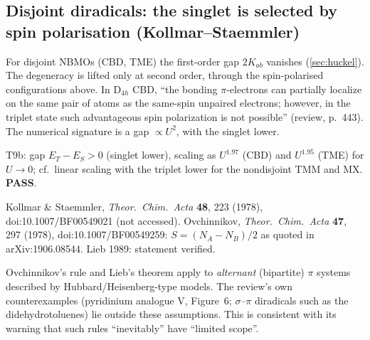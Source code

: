 \subsection{Disjoint diradicals: the singlet is selected by spin polarisation (Kollmar--Staemmler)}
For disjoint NBMOs (CBD, TME) the first-order gap $2K_{ab}$ vanishes (\cref{sec:huckel}). The degeneracy is
lifted only at second order, through the spin-polarised configurations above. In D$_{4h}$ CBD, ``the
bonding $\pi$-electrons can partially localize on the same pair of atoms as the same-spin unpaired
electrons; however, in the triplet state such advantageous spin polarization is not possible'' (review,
p.~443). The numerical signature is a gap $\propto U^2$, with the singlet lower.
\begin{verifybox}
T9b: gap $E_T-E_S>0$ (singlet lower), scaling as $U^{1.97}$ (CBD) and $U^{1.95}$ (TME) for $U\to0$;
cf.\ linear scaling with the triplet lower for the nondisjoint TMM and MX. \textbf{PASS}.
\end{verifybox}
\begin{sourcebox}
Kollmar \& Staemmler, \emph{Theor.\ Chim.\ Acta} \textbf{48}, 223 (1978), doi:10.1007/BF00549021 (not accessed).
Ovchinnikov, \emph{Theor.\ Chim.\ Acta} \textbf{47}, 297 (1978), doi:10.1007/BF00549259: $S=(N_A-N_B)/2$ as quoted in
arXiv:1906.08544. Lieb 1989: statement verified.
\end{sourcebox}
\begin{caveatbox}
Ovchinnikov's rule and Lieb's theorem apply to \emph{alternant} (bipartite) $\pi$ systems described by
Hubbard/Heisenberg-type models. The review's own counterexamples (pyridinium analogue V, Figure~6;
$\sigma$--$\pi$ diradicals such as the didehydrotoluenes) lie outside these assumptions. This is consistent
with its warning that such rules ``inevitably'' have ``limited scope''.
\end{caveatbox}
